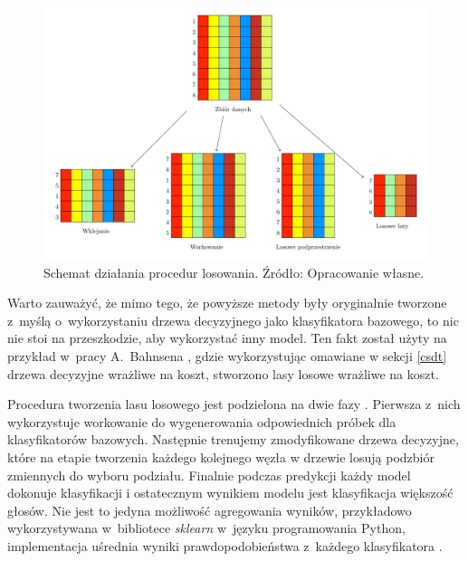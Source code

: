 \documentclass[inzynierska]{pwr_wmat_praca_dyplomowa}
\theoremstyle{plain}
\numberwithin{theorem}{chapter}
\theoremstyle{definition}
\numberwithin{theorem}{chapter}
\begin{document}
\begin{figure}[h]
	\includegraphics[width=\linewidth]{plots/sampling_plot.pdf}
	\caption{Schemat działania procedur losowania. Źródło: Opracowanie własne.}
	\label{fig:sampling_plot}
\end{figure}

Warto zauważyć, że mimo tego, że powyższe metody były oryginalnie tworzone z~myślą o~wykorzystaniu drzewa decyzyjnego jako klasyfikatora bazowego, to nic nie stoi na przeszkodzie, aby wykorzystać inny model. Ten fakt został użyty na przykład w~pracy A.~Bahnsena \cite{alej2015ensemble}, gdzie wykorzystując omawiane w sekcji \ref{csdt} drzewa decyzyjne wrażliwe na koszt, stworzono lasy losowe wrażliwe na koszt.

Procedura tworzenia lasu losowego jest podzielona na dwie fazy \cite{Random_Forest}. Pierwsza z~nich wykorzystuje workowanie do wygenerowania odpowiednich próbek dla klasyfikatorów bazowych. Następnie trenujemy zmodyfikowane drzewa decyzyjne, które na etapie tworzenia każdego kolejnego węzła w drzewie losują podzbiór zmiennych do wyboru podziału. Finalnie podczas predykcji każdy model dokonuje klasyfikacji i ostatecznym wynikiem modelu jest klasyfikacja większość głosów. Nie jest to jedyna możliwość agregowania wyników, przykładowo wykorzystywana w~bibliotece \textit{sklearn} w~języku programowania Python, implementacja uśrednia wyniki prawdopodobieństwa z~każdego klasyfikatora \cite{sklearn_api}.
\end{document}
